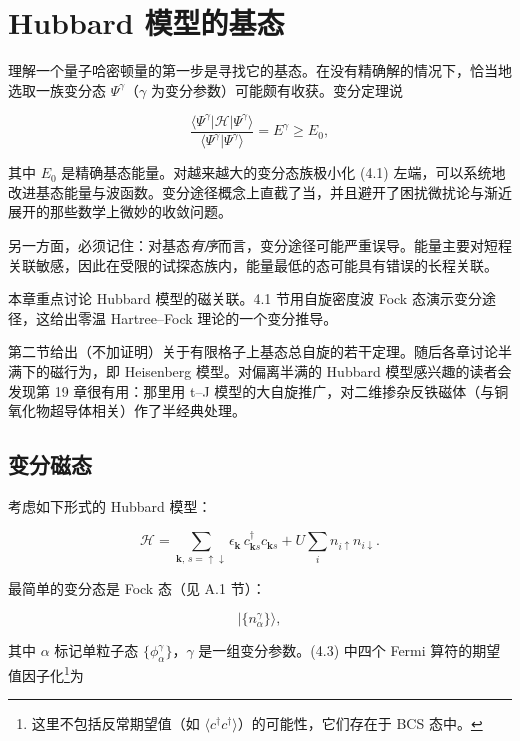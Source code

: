 \chapter{Hubbard 模型的基态}

理解一个量子哈密顿量的第一步是寻找它的基态。在没有精确解的情况下，恰当地选取一族变分态 $\Psi^{\gamma}$（$\gamma$ 为变分参数）可能颇有收获。变分定理说

\begin{equation*}
\frac {\langle \Psi^ {\gamma} | \mathcal {H} | \Psi^ {\gamma} \rangle}{\langle \Psi^ {\gamma} | \Psi^ {\gamma} \rangle} = E ^ {\gamma} \geq E _ {0},
\tag{4.1}
\end{equation*}

其中 $E_{0}$ 是精确基态能量。对越来越大的变分态族极小化 (4.1) 左端，可以系统地改进基态能量与波函数。变分途径概念上直截了当，并且避开了困扰微扰论与渐近展开的那些数学上微妙的收敛问题。

另一方面，必须记住：对基态\emph{有序}而言，变分途径可能严重误导。能量主要对短程关联敏感，因此在受限的试探态族内，能量最低的态可能具有错误的长程关联。

本章重点讨论 Hubbard 模型的磁关联。4.1 节用自旋密度波 Fock 态演示变分途径，这给出零温 Hartree--Fock 理论的一个变分推导。

第二节给出（不加证明）关于有限格子上基态总自旋的若干定理。随后各章讨论半满下的磁行为，即 Heisenberg 模型。对偏离半满的 Hubbard 模型感兴趣的读者会发现第 19 章很有用：那里用 t--J 模型的大自旋推广，对二维掺杂反铁磁体（与铜氧化物超导体相关）作了半经典处理。

\section{变分磁态}

考虑如下形式的 Hubbard 模型：

\begin{equation*}
\mathcal {H} = \sum_ {\mathbf {k},\, s = \uparrow \downarrow} \epsilon_ {\mathbf {k}} \, c _ {\mathbf {k} s} ^ {\dagger} c _ {\mathbf {k} s} + U \sum_ {i} n _ {i \uparrow} n _ {i \downarrow}.
\tag{4.2}
\end{equation*}

最简单的变分态是 Fock 态（见 A.1 节）：

\begin{equation*}
| \{n _ {\alpha} ^ {\gamma} \} \rangle ,
\tag{4.3}
\end{equation*}

其中 $\alpha$ 标记单粒子态 $\{\phi_{\alpha}^{\gamma}\}$，$\gamma$ 是一组变分参数。(4.3) 中四个 Fermi 算符的期望值因子化\footnote{这里不包括反常期望值（如 $\langle c^{\dagger}c^{\dagger}\rangle$）的可能性，它们存在于 BCS 态中。}为

